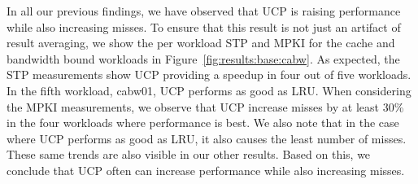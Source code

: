 In all our previous findings, we have observed that UCP is raising performance while also increasing misses.
To ensure that this result is not just an artifact of result averaging, we show the per workload STP and MPKI for the cache and bandwidth bound workloads in Figure~\ref{fig:results:base:cabw}.
As expected, the STP measurements show UCP providing a speedup in four out of five workloads.
In the fifth workload, cabw01, UCP performs as good as LRU.
When considering the MPKI measurements, we observe that UCP increase misses by at least 30\% in the four workloads where performance is best.
We also note that in the case where UCP performs as good as LRU, it also causes the least number of misses.
These same trends are also visible in our other results.
Based on this, we conclude that UCP often can increase performance while also increasing misses.

